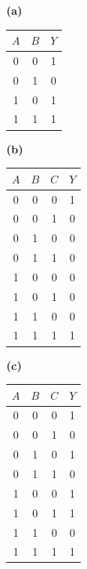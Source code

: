 \documentclass[letterpaper,12pt]{article}
\begin{document}
\begin{figure}[h]
\centering
\small %
\renewcommand{\arraystretch}{1.1}

\begin{minipage}[t]{0.12\textwidth}
    \textbf{(a)} \\
    \begin{tabular}[t]{cc|c}
    $A$ & $B$ & $Y$ \\
    \hline
    0 & 0 & 1 \\
    0 & 1 & 0 \\
    1 & 0 & 1 \\
    1 & 1 & 1 \\
    \end{tabular}
\end{minipage}
\hfill
\begin{minipage}[t]{0.16\textwidth}
    \textbf{(b)} \\
    \begin{tabular}[t]{ccc|c}
    $A$ & $B$ & $C$ & $Y$ \\
    \hline
    0 & 0 & 0 & 1 \\
    0 & 0 & 1 & 0 \\
    0 & 1 & 0 & 0 \\
    0 & 1 & 1 & 0 \\
    1 & 0 & 0 & 0 \\
    1 & 0 & 1 & 0 \\
    1 & 1 & 0 & 0 \\
    1 & 1 & 1 & 1 \\
    \end{tabular}
\end{minipage}
\hfill
\begin{minipage}[t]{0.16\textwidth}
    \textbf{(c)} \\
    \begin{tabular}[t]{ccc|c}
    $A$ & $B$ & $C$ & $Y$ \\
    \hline
    0 & 0 & 0 & 1 \\
    0 & 0 & 1 & 0 \\
    0 & 1 & 0 & 1 \\
    0 & 1 & 1 & 0 \\
    1 & 0 & 0 & 1 \\
    1 & 0 & 1 & 1 \\
    1 & 1 & 0 & 0 \\
    1 & 1 & 1 & 1 \\
    \end{tabular}

\end{minipage}
\end{figure}
\end{document}
